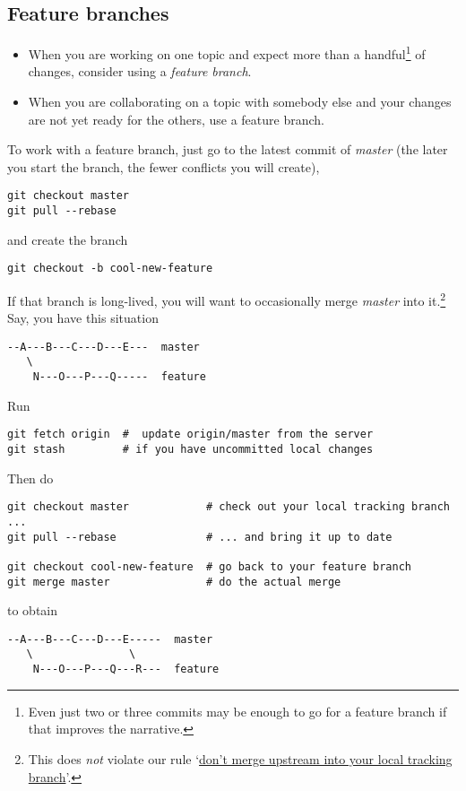 \documentclass[12pt,pdftex]{article}
\begin{document}
\subsection{Feature branches}
\label{sec-5-2}

\begin{itemize}
\item When you are working on one topic and expect more than a
handful\footnote{Even just two or three commits may be enough to go for a feature
branch if that improves the narrative.} of changes, consider using a \emph{feature branch}.

\item When you are collaborating on a topic with somebody else and your
changes are not yet ready for the others, use a feature branch.
\end{itemize}


To work with a feature branch, just go to the latest commit of \emph{master}
(the later you start the branch, the fewer conflicts you will create),

\lstset{frame=single,basicstyle=\ttfamily\footnotesize,language=sh,label= ,caption= ,captionpos=b,numbers=none}
\begin{lstlisting}
git checkout master
git pull --rebase
\end{lstlisting}
and create the branch
\lstset{frame=single,basicstyle=\ttfamily\footnotesize,language=sh,label= ,caption= ,captionpos=b,numbers=none}
\begin{lstlisting}
git checkout -b cool-new-feature
\end{lstlisting}

\bigskip

If that branch is long-lived, you will want to occasionally merge
\emph{master} into it.\footnote{This does \emph{not} violate our rule
`\hyperref[sec-5-1]{don't merge upstream into your local tracking branch}'.}
Say, you have this situation
\begin{verbatim}
--A---B---C---D---E---  master
   \
    N---O---P---Q-----  feature
\end{verbatim}
Run
\lstset{frame=single,basicstyle=\ttfamily\footnotesize,language=sh,label= ,caption= ,captionpos=b,numbers=none}
\begin{lstlisting}
git fetch origin  #  update origin/master from the server
git stash         # if you have uncommitted local changes
\end{lstlisting}

Then do
\lstset{frame=single,basicstyle=\ttfamily\footnotesize,language=sh,label= ,caption= ,captionpos=b,numbers=none}
\begin{lstlisting}
git checkout master            # check out your local tracking branch ...
git pull --rebase              # ... and bring it up to date

git checkout cool-new-feature  # go back to your feature branch
git merge master               # do the actual merge
\end{lstlisting}
to obtain
\begin{verbatim}
--A---B---C---D---E-----  master
   \               \
    N---O---P---Q---R---  feature
\end{verbatim}
\end{document}

